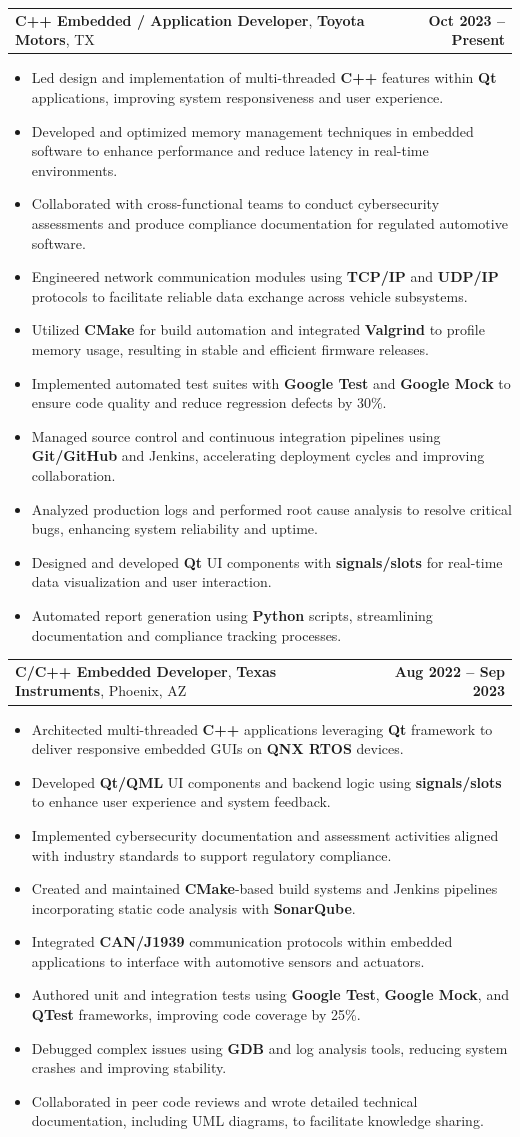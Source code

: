 \documentclass[letterpaper,11pt]{article}
\makeatletter
\newcommand{\resumeItem}[1]{
  \item\footnotesize{
    {#1 \vspace{-2pt}}
  }
}
\newcommand{\resumeSubheading}[4]{
  \vspace{-2pt}\item
    \begin{tabular*}{1.0\textwidth}[t]{l@{\extracolsep{\fill}}r}
      \textbf{\fontsize{10pt}{14pt}\selectfont #3}, \textbf{\fontsize{10pt}{14pt}\selectfont #1}, \fontsize{10pt}{14pt}\selectfont #4 & \textbf{\fontsize{10pt}{14pt}\selectfont #2} \\
    \end{tabular*}\vspace{-7pt}
}
\newcommand{\resumeItemListStart}{\begin{itemize}[leftmargin=*]}
\newcommand{\resumeItemListEnd}{\end{itemize}\vspace{-5pt}}
\makeatother
\begin{document}
    \resumeSubheading
        {Toyota Motors}{Oct 2023 -- Present}
        {C++ Embedded / Application Developer}{TX}
      \resumeItemListStart
        \resumeItem{Led design and implementation of multi-threaded \textbf{C++} features within \textbf{Qt} applications, improving system responsiveness and user experience.}
        \resumeItem{Developed and optimized memory management techniques in embedded software to enhance performance and reduce latency in real-time environments.}
        \resumeItem{Collaborated with cross-functional teams to conduct cybersecurity assessments and produce compliance documentation for regulated automotive software.}
        \resumeItem{Engineered network communication modules using \textbf{TCP/IP} and \textbf{UDP/IP} protocols to facilitate reliable data exchange across vehicle subsystems.}
        \resumeItem{Utilized \textbf{CMake} for build automation and integrated \textbf{Valgrind} to profile memory usage, resulting in stable and efficient firmware releases.}
        \resumeItem{Implemented automated test suites with \textbf{Google Test} and \textbf{Google Mock} to ensure code quality and reduce regression defects by 30\%.}
        \resumeItem{Managed source control and continuous integration pipelines using \textbf{Git/GitHub} and Jenkins, accelerating deployment cycles and improving collaboration.}
        \resumeItem{Analyzed production logs and performed root cause analysis to resolve critical bugs, enhancing system reliability and uptime.}
        \resumeItem{Designed and developed \textbf{Qt} UI components with \textbf{signals/slots} for real-time data visualization and user interaction.}
        \resumeItem{Automated report generation using \textbf{Python} scripts, streamlining documentation and compliance tracking processes.}
      \resumeItemListEnd

    \resumeSubheading
        {Texas Instruments}{Aug 2022 -- Sep 2023}
        {C/C++ Embedded Developer}{Phoenix, AZ}
      \resumeItemListStart
        \resumeItem{Architected multi-threaded \textbf{C++} applications leveraging \textbf{Qt} framework to deliver responsive embedded GUIs on \textbf{QNX RTOS} devices.}
        \resumeItem{Developed \textbf{Qt/QML} UI components and backend logic using \textbf{signals/slots} to enhance user experience and system feedback.}
        \resumeItem{Implemented cybersecurity documentation and assessment activities aligned with industry standards to support regulatory compliance.}
        \resumeItem{Created and maintained \textbf{CMake}-based build systems and Jenkins pipelines incorporating static code analysis with \textbf{SonarQube}.}
        \resumeItem{Integrated \textbf{CAN/J1939} communication protocols within embedded applications to interface with automotive sensors and actuators.}
        \resumeItem{Authored unit and integration tests using \textbf{Google Test}, \textbf{Google Mock}, and \textbf{QTest} frameworks, improving code coverage by 25\%.}
        \resumeItem{Debugged complex issues using \textbf{GDB} and log analysis tools, reducing system crashes and improving stability.}
        \resumeItem{Collaborated in peer code reviews and wrote detailed technical documentation, including UML diagrams, to facilitate knowledge sharing.}
      \resumeItemListEnd
\end{document}
